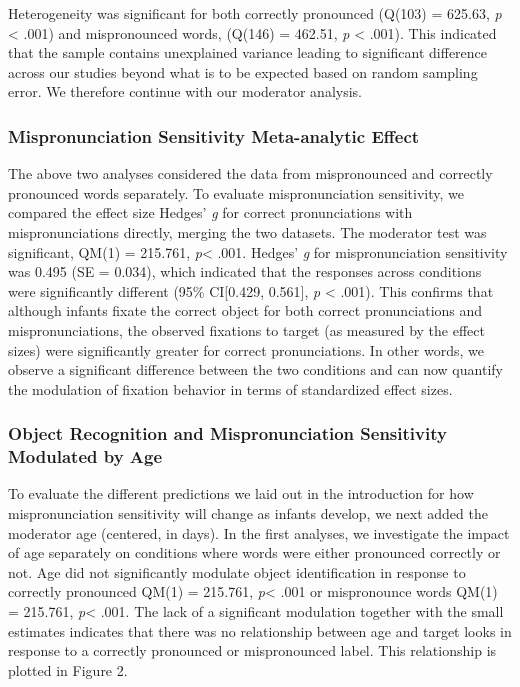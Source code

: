 \documentclass[man]{apa6}
\theoremstyle{definition}
\theoremstyle{definition}
\theoremstyle{definition}
\theoremstyle{remark}
\begin{document}
Heterogeneity was significant for both correctly pronounced (Q(103) =
625.63, \emph{p} \textless{} .001) and mispronounced words, (Q(146) =
462.51, \emph{p} \textless{} .001). This indicated that the sample
contains unexplained variance leading to significant difference across
our studies beyond what is to be expected based on random sampling
error. We therefore continue with our moderator analysis.

\subsubsection{Mispronunciation Sensitivity Meta-analytic
Effect}\label{mispronunciation-sensitivity-meta-analytic-effect}

The above two analyses considered the data from mispronounced and
correctly pronounced words separately. To evaluate mispronunciation
sensitivity, we compared the effect size Hedges' \emph{g} for correct
pronunciations with mispronunciations directly, merging the two
datasets. The moderator test was significant, QM(1) = 215.761,
\emph{p}\textless{} .001. Hedges' \emph{g} for mispronunciation
sensitivity was 0.495 (SE = 0.034), which indicated that the responses
across conditions were significantly different (95\% CI{[}0.429,
0.561{]}, \emph{p} \textless{} .001). This confirms that although
infants fixate the correct object for both correct pronunciations and
mispronunciations, the observed fixations to target (as measured by the
effect sizes) were significantly greater for correct pronunciations. In
other words, we observe a significant difference between the two
conditions and can now quantify the modulation of fixation behavior in
terms of standardized effect sizes.

\subsubsection{Object Recognition and Mispronunciation Sensitivity
Modulated by
Age}\label{object-recognition-and-mispronunciation-sensitivity-modulated-by-age}

To evaluate the different predictions we laid out in the introduction
for how mispronunciation sensitivity will change as infants develop, we
next added the moderator age (centered, in days). In the first analyses,
we investigate the impact of age separately on conditions where words
were either pronounced correctly or not. Age did not significantly
modulate object identification in response to correctly pronounced QM(1)
= 215.761, \emph{p}\textless{} .001 or mispronounce words QM(1) =
215.761, \emph{p}\textless{} .001. The lack of a significant modulation
together with the small estimates indicates that there was no
relationship between age and target looks in response to a correctly
pronounced or mispronounced label. This relationship is plotted in
Figure 2.
\end{document}
